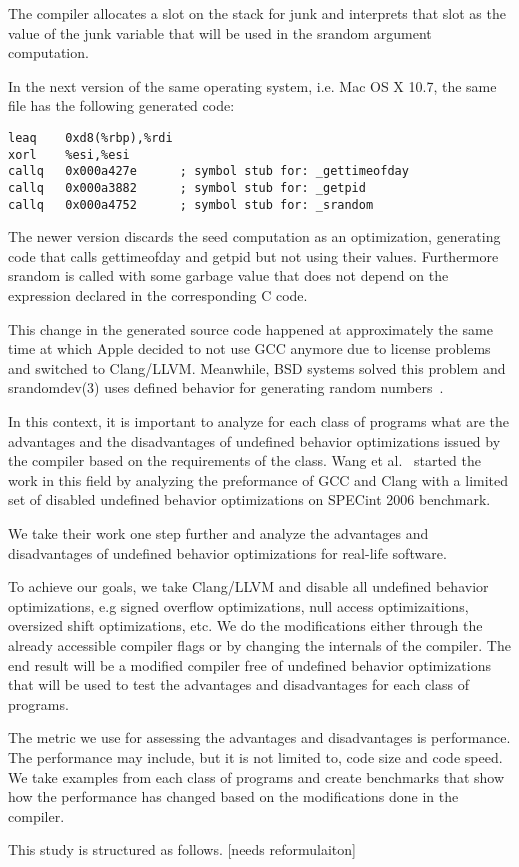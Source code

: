 The compiler allocates a slot on the stack for junk and interprets that
slot as the value of the junk variable that will be used in the srandom
argument computation. 

In the next version of the same operating system, i.e. Mac OS X 10.7,
the same file has the following generated code:
\begin{lstlisting}[style=Cstyle, caption={}, label={}]
leaq    0xd8(%rbp),%rdi
xorl    %esi,%esi
callq   0x000a427e      ; symbol stub for: _gettimeofday
callq   0x000a3882      ; symbol stub for: _getpid
callq   0x000a4752      ; symbol stub for: _srandom
\end{lstlisting}

The newer version discards the seed computation as an optimization,
generating code that calls gettimeofday and getpid but not using their
values. Furthermore srandom is called with some garbage value that does
not depend on the expression declared in the corresponding C code.

This change in the generated source code happened at approximately the
same time at which Apple decided to not use GCC anymore due to license
problems and switched to Clang/LLVM. Meanwhile, BSD systems solved this
problem and srandomdev(3) uses defined behavior for generating random
numbers~\cite{junkobsd,junkfbsd,junkdbsd}.

In this context, it is important to analyze for each class of programs
what are the advantages and the disadvantages of undefined behavior
optimizations issued by the compiler based on the requirements of the
class. Wang et al.~\cite{wang2012undefined} started the work in this
field by analyzing the preformance of GCC and Clang with a limited set
of disabled undefined behavior optimizations on SPECint 2006 benchmark.

We take their work one step further and analyze the advantages and
disadvantages of undefined behavior optimizations for real-life
software.

To achieve our goals, we take Clang/LLVM and disable all undefined
behavior optimizations, e.g signed overflow optimizations, null access
optimizaitions, oversized shift optimizations, etc. We do the
modifications either through the already accessible compiler flags
or by changing the internals of the compiler. The end result will be a
modified compiler free of undefined behavior optimizations that will be
used to test the advantages and disadvantages for each class of
programs.

The metric we use for assessing the advantages and disadvantages is
performance. The performance may include, but it is not limited to, code
size and code speed. We take examples from each class of programs and
create benchmarks that show how the performance has changed based on the
modifications done in the compiler.

This study is structured as follows. [needs reformulaiton]
